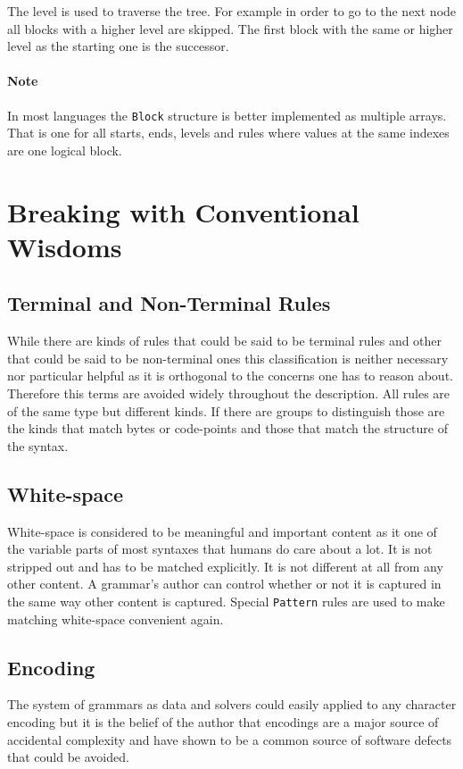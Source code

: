 \documentclass[10pt,a4paper]{article}
\begin{document}
The level is used to traverse the tree. For example in order to go to the next node all blocks with a higher level are skipped. The first block with the same or higher level as the starting one is the successor.

\paragraph{Note} In most languages the \texttt{Block} structure is better implemented as multiple arrays. That is one for all starts, ends, levels and rules where values at the same indexes are one logical block.

\section{Breaking with Conventional Wisdoms}
\subsection{Terminal and Non-Terminal Rules}
While there are kinds of rules that could be said to be terminal rules and other that could be said to be non-terminal ones this classification is neither necessary nor particular helpful as it is orthogonal to the concerns one has to reason about. Therefore this terms are avoided widely throughout the description. All rules are of the same type but different kinds. If there are groups to distinguish those are the kinds that match bytes or code-points and those that match the structure of the syntax.

\subsection{White-space}
White-space is considered to be meaningful and important content as it one of the variable parts of most syntaxes that humans do care about a lot. It is not stripped out and has to be matched explicitly. It is not different at all from any other content. A grammar's author can control whether or not it is captured in the same way other content is captured. Special \texttt{Pattern} rules are used to make matching white-space convenient again.

\subsection{Encoding}
The system of grammars as data and solvers could easily applied to any character encoding but it is the belief of the author that encodings are a major source of accidental complexity and have shown to be a common source of software defects that could be avoided. 
\end{document}
